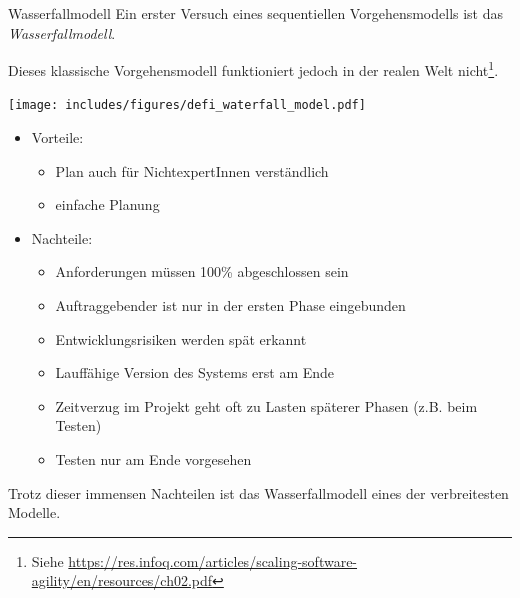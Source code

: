 \begin{defi}{Wasserfallmodell}
    Ein erster Versuch eines sequentiellen Vorgehensmodells ist das \emph{Wasserfallmodell}.

    Dieses klassische Vorgehensmodell funktioniert jedoch in der realen Welt nicht\footnote{Siehe \href{https://res.infoq.com/articles/scaling-software-agility/en/resources/ch02.pdf}{https://res.infoq.com/articles/scaling-software-agility/en/resources/ch02.pdf}}.

    \begin{center}
        \texttt{[image: includes/figures/defi\_waterfall\_model.pdf]}
    \end{center}

    \begin{itemize}
        \item Vorteile:
              \begin{itemize}
                  \item Plan auch für NichtexpertInnen verständlich
                  \item einfache Planung
              \end{itemize}
        \item Nachteile:
              \begin{itemize}
                  \item Anforderungen müssen 100\% abgeschlossen sein
                  \item Auftraggebender ist nur in der ersten Phase eingebunden
                  \item Entwicklungsrisiken werden spät erkannt
                  \item Lauffähige Version des Systems erst am Ende
                  \item Zeitverzug im Projekt geht oft zu Lasten späterer Phasen (z.B. beim Testen)
                  \item Testen nur am Ende vorgesehen
              \end{itemize}
    \end{itemize}

    Trotz dieser immensen Nachteilen ist das Wasserfallmodell eines der verbreitesten Modelle.
\end{defi}

